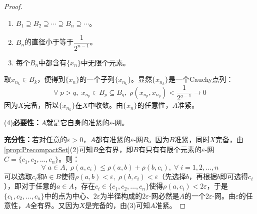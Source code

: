 \begin{proof}
	\begin{enumerate}
		\item $B_1\supseteq B_2\supseteq\cdots\supseteq B_n\supseteq\cdots$。
		\item $B_n$的直径小于等于$\dfrac{1}{2^{n-1}}$。
		\item 每个$B_n$中都含有$\{x_n\}$中无限个元素。
	\end{enumerate}
	取$x_{n_k}\in B_k$，便得到$\{x_n\}$的一个子列$\{x_{n_k}\}$。显然$\{x_{n_k}\}$是一个Cauchy点列：
	\begin{equation*}
		\forall\;p>q,\;x_{n_p}\in B_p\subseteq B_q,\;\rho(x_{n_p},x_{n_q})<\frac{1}{2^{q-1}}\to0
	\end{equation*}	
	因为$X$完备，所以$\{x_{n_k}\}$在$X$中收敛。由$\{x_n\}$的任意性，$A$准紧。\par
	(4)\textbf{必要性：}$A$就是它自身的准紧的$\varepsilon$-网。\par
	\textbf{充分性：}若对任意的$\varepsilon>0$，$A$都有准紧的$\varepsilon$-网$B$。因为$B$准紧，同时$X$完备，由\cref{prop:PrecompactSet}(2)可知$B$全有界，即$B$有只有有限个元素的$\varepsilon$-网$C=\{c_1,c_2,\dots,c_n\}$。则：
	\begin{equation*}
		\forall\;a\in A,\;\rho(a,c_i)\leqslant\rho(a,b)+\rho(b,c_i),\;\forall\;i=1,2,\dots,n
	\end{equation*}
	可以选取$c_i$和$b\in B$使得$\rho(a,b)<\varepsilon,\;\rho(b,c_i)<\varepsilon$（先选择$b$，再根据$b$即可选得$c_i$），即对于任意的$a\in A$，存在$c_i\in\{c_1,c_2,\dots,c_n\}$使得$\rho(a,c_i)<2\varepsilon$，于是$\{c_1,c_2,\dots,c_n\}$中的点为中心、$2\varepsilon$为半径构成的$2\varepsilon$-网必然是$A$的一个$2\varepsilon$-网。由$\varepsilon$的任意性，$A$全有界。又因为$X$是完备的，由(3)可知$A$准紧。
\end{proof}